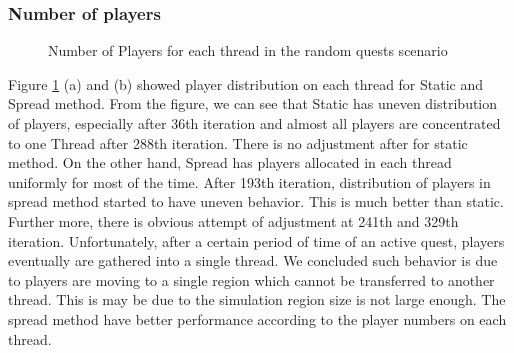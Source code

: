 \documentclass[12pt,a4paper]{article} %
\theoremstyle{definition}
\theoremstyle{remark}
\begin{document}
\subsubsection {Number of players}
	\begin{figure}[!ht]
		\hfill
		\caption{Number of Players for each thread in the random quests scenario}
		\label{Player_random}
	\end{figure}
Figure \ref{Player_random} (a) and (b) showed player distribution on each thread for Static and Spread method. 
From the figure, we can see that Static
has uneven distribution of players, especially after 36th iteration and almost all players are concentrated to one Thread after 288th iteration. There is no adjustment after for static method. 
On the other hand, Spread has players allocated in each thread uniformly for most of the time.
After 193th iteration,  distribution of players in spread method started to have uneven behavior. This is much better than static. Further  more, there is obvious attempt of adjustment at 241th  and 329th iteration. 
Unfortunately, after a certain period of time of an active quest, players eventually are gathered into a single
thread. 
We concluded such behavior is due to players are moving to a single region which cannot be
transferred to another thread. 
This is may be due to the simulation region size is not large enough. 
The spread method have better performance according to the player numbers on each thread.
\end{document}
